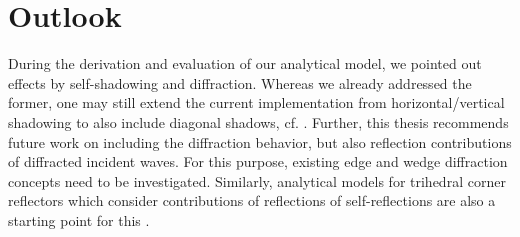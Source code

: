 \section{Outlook}
During the derivation and evaluation of our analytical model, we pointed out effects by self-shadowing and diffraction. Whereas we already addressed the former, one may still extend the current implementation from horizontal/vertical shadowing to also include diagonal shadows, cf. . Further, this thesis recommends future work on including the diffraction behavior, but also reflection contributions of diffracted incident waves. For this purpose, existing edge and wedge diffraction concepts need to be investigated. Similarly, analytical models for trihedral corner reflectors which consider contributions of reflections of self-reflections are also a starting point for this \cite{Diff1, Diff2}.
 
 
 








